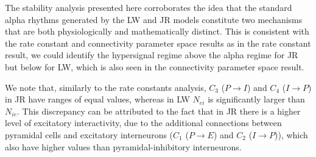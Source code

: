 \documentclass[12pt,twoside]{article}
\begin{document}
The stability analysis presented here corroborates the idea that the standard alpha rhythms generated by the LW and JR models constitute two mechanisms that are both physiologically and mathematically distinct. This is consistent with the rate constant and connectivity parameter space results as in the rate constant result, we could identify the hypersignal regime above the alpha regime for JR but below for LW, which is also seen in the connectivity parameter space result.

We note that, similarly to the rate constants analysis, $C_{3}$ ($P \rightarrow I$) and $C_{4}$ ($I \rightarrow P$) in JR have ranges of equal values, whereas in LW $N_{ei}$ is significantly larger than $N_{ie}$. This discrepancy can be attributed to the fact that in JR there is a higher level of excitatory interactivity, due to the additional connections between pyramidal cells and excitatory interneurons ($C_{1}$ ($P \rightarrow E$) and $C_{2}$ ($I \rightarrow P$)), which also have higher values than pyramidal-inhibitory interneurons. 
\end{document}
